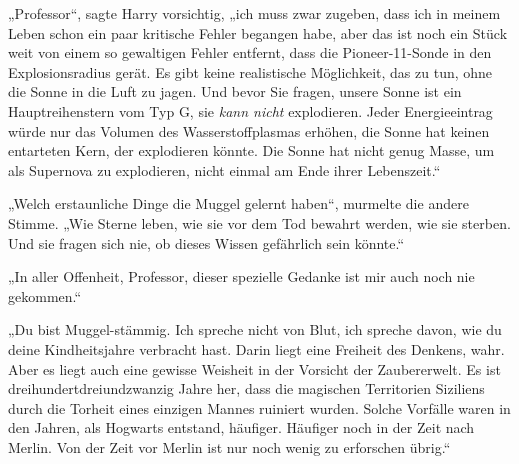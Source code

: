 „Professor“, sagte Harry vorsichtig, „ich muss zwar zugeben, dass ich in meinem Leben schon ein paar kritische Fehler begangen habe, aber das ist noch ein Stück weit von einem so gewaltigen Fehler entfernt, dass die Pioneer-11-Sonde in den Explosionsradius gerät. Es gibt keine realistische Möglichkeit, das zu tun, ohne die Sonne in die Luft zu jagen. Und bevor Sie fragen, unsere Sonne ist ein Hauptreihenstern vom Typ G, sie \emph{kann nicht} explodieren. Jeder Energieeintrag würde nur das Volumen des Wasserstoffplasmas erhöhen, die Sonne hat keinen entarteten Kern, der explodieren könnte. Die Sonne hat nicht genug Masse, um als Supernova zu explodieren, nicht einmal am Ende ihrer Lebenszeit.“

„Welch erstaunliche Dinge die Muggel gelernt haben“, murmelte die andere Stimme.
„Wie Sterne leben, wie sie vor dem Tod bewahrt werden, wie sie sterben. Und sie fragen sich nie, ob dieses Wissen gefährlich sein könnte.“

„In aller Offenheit, Professor, dieser spezielle Gedanke ist mir auch noch nie gekommen.“

„Du bist Muggel-stämmig. Ich spreche nicht von Blut, ich spreche davon, wie du deine Kindheitsjahre verbracht hast. Darin liegt eine Freiheit des Denkens, wahr. Aber es liegt auch eine gewisse Weisheit in der Vorsicht der Zaubererwelt. Es ist dreihundertdreiundzwanzig Jahre her, dass die magischen Territorien Siziliens durch die Torheit eines einzigen Mannes ruiniert wurden. Solche Vorfälle waren in den Jahren, als Hogwarts entstand, häufiger. Häufiger noch in der Zeit nach Merlin. Von der Zeit vor Merlin ist nur noch wenig zu erforschen übrig.“

